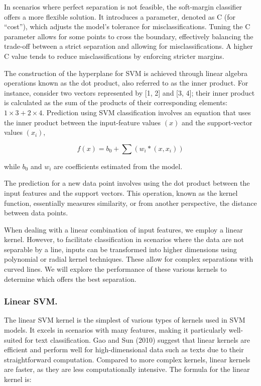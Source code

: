In scenarios where perfect separation is not feasible, the soft-margin
classifier offers a more flexible solution. It introduces a parameter,
denoted as C (for ``cost''), which adjusts the model's tolerance for
misclassifications. Tuning the C parameter allows for some points to
cross the boundary, effectively balancing the trade-off between a strict
separation and allowing for misclassifications. A higher C value tends to
reduce misclassifications by enforcing stricter margins.

The construction of the hyperplane for SVM is achieved through linear
algebra operations known as the dot product, also referred to as the
inner product. For instance, consider two vectors represented by {[}1,
2{]} and {[}3, 4{]}; their inner product is calculated as the sum of the
products of their corresponding elements: \(1\times 3 + 2\times 4\).
Prediction using SVM classification involves an equation that uses
the inner product between the input-feature values \((x)\) and the
support-vector values \((x_i)\),

\[f(x)=b_0 + \sum(w_i*(x,x_i))\]

while \(b_0\) and \(w_i\) are coefficients estimated from the model.

The prediction for a new data point involves using the dot product between the
input features and the support vectors. This operation, known as the
kernel function, essentially measures similarity, or from another
perspective, the distance between data points.

When dealing with a linear combination of input features, we employ a
linear kernel. However, to facilitate classification in scenarios where
the data are not separable by a line, inputs can be transformed into
higher dimensions using polynomial or radial kernel techniques. These
allow for complex separations with curved lines. We will explore the
performance of these various kernels to determine which offers the best
separation.

\subsubsection{Linear SVM.}\label{linear-svm.}

The linear SVM kernel is the simplest of various types of kernels
used in SVM models. It excels in scenarios with many features, making it
particularly well-suited for text classification. Gao
and Sun (2010) suggest that linear kernels are efficient and perform well
for high-dimensional data such as texts due to their straightforward
computation. Compared to more complex kernels, linear kernels are
faster, as they are less computationally intensive. The
formula for the linear kernel is:

